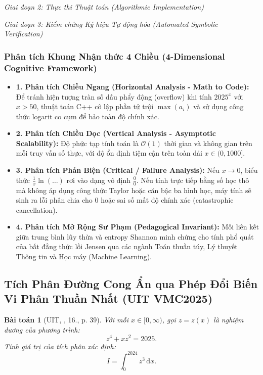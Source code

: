 \documentclass{article}
\newtheorem{baitoan}{Bài toán}
\begin{document}
\vspace{0.5em}\noindent\emph{Giai đoạn 2: Thực thi Thuật toán (Algorithmic Implementation)}


\vspace{0.5em}\noindent\emph{Giai đoạn 3: Kiểm chứng Ký hiệu Tự động hóa (Automated Symbolic Verification)}


\subsubsection*{Phân tích Khung Nhận thức 4 Chiều (4-Dimensional Cognitive Framework)}
\begin{itemize}
    \item \textbf{1. Phân tích Chiều Ngang (Horizontal Analysis - Math to Code):} Để tránh hiện tượng tràn số dấu phẩy động (overflow) khi tính $2025^x$ với $x > 50$, thuật toán C++ cô lập phần tử trội $\max(a_i)$ và sử dụng công thức logarit co cụm để bảo toàn độ chính xác.
    \item \textbf{2. Phân tích Chiều Dọc (Vertical Analysis - Asymptotic Scalability):} Độ phức tạp tính toán là $\mathcal{O}(1)$ thời gian và không gian trên mỗi truy vấn số thực, với độ ổn định tiệm cận trên toàn dải $x \in (0, 1000]$.
    \item \textbf{3. Phân tích Phản Biện (Critical / Failure Analysis):} Nếu $x \to 0$, biểu thức $\frac{1}{x} \ln(\dots)$ rơi vào dạng vô định $\frac{0}{0}$. Nếu tính trực tiếp bằng số học thô mà không áp dụng công thức Taylor hoặc căn bậc ba hình học, máy tính sẽ sinh ra lỗi phân chia cho 0 hoặc sai số mất độ chính xác (catastrophic cancellation).
    \item \textbf{4. Phân tích Mở Rộng Sư Phạm (Pedagogical Invariant):} Mối liên kết giữa trung bình lũy thừa và entropy Shannon minh chứng cho tính phổ quát của bất đẳng thức lồi Jensen qua các ngành Toán thuần túy, Lý thuyết Thông tin và Học máy (Machine Learning).
\end{itemize}

\subsection{Tích Phân Đường Cong Ẩn qua Phép Đổi Biến Vi Phân Thuần Nhất (UIT VMC2025)}

\begin{baitoan}[UIT, \cite{VMS_VMC2025}, 16., p. 39]
Với mỗi $x \in [0, \infty)$, gọi $z = z(x)$ là nghiệm dương của phương trình:
\begin{equation}
    z^4 + x z^2 = 2025.
\end{equation}
Tính giá trị của tích phân xác định:
\begin{equation}
    I = \int_0^{2024} z^3 \, \mathrm{d}x.
\end{equation}
\end{baitoan}
\end{document}
